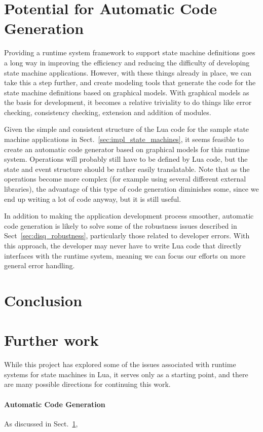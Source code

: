 \section{Potential for Automatic Code Generation}
\label{sec:disq_automatic_code}
Providing a runtime system framework to support state machine definitions goes a long way in improving the efficiency and reducing the difficulty of developing state machine applications. However, with these things already in place, we can take this a step further, and create modeling tools that generate the code for the state machine definitions based on graphical models. With graphical models as the basis for development, it becomes a relative triviality to do things like error checking, consistency checking, extension and addition of modules.

Given the simple and consistent structure of the Lua code for the sample state machine applications in Sect.~\ref{sec:impl_state_machines}, it seems feasible to create an automatic code generator based on graphical models for this runtime system. Operations will probably still have to be defined by Lua code, but the state and event structure should be rather easily translatable. Note that as the operations become more complex (for example using several different external libraries), the advantage of this type of code generation diminishes some, since we end up writing a lot of code anyway, but it is still useful.

In addition to making the application development process smoother, automatic code generation is likely to solve some of the robustness issues described in Sect~\ref{sec:disq_robustness}, particularly those related to developer errors. With this approach, the developer may never have to write Lua code that directly interfaces with the runtime system, meaning we can focus our efforts on more general error handling.

\section{Conclusion}
\label{sec:conclusion}

\section{Further work}
\label{sec:further_work}
While this project has explored some of the issues associated with runtime systems for state machines in Lua, it serves only as a starting point, and there are many possible directions for continuing this work.

\paragraph{Automatic Code Generation} As discussed in Sect.~\ref{sec:disq_automatic_code}, 